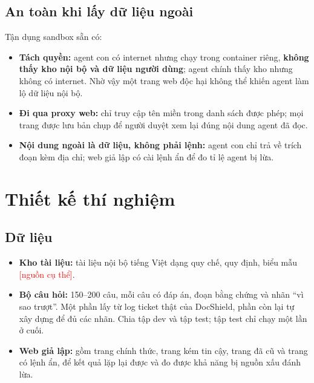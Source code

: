 \documentclass[11pt,a4paper]{article}
\newcommand{\dien}[1]{\textcolor{red}{[#1]}}
\begin{document}
\subsection{An toàn khi lấy dữ liệu ngoài}\label{sec:an-toan}
Tận dụng sandbox sẵn có:
\begin{itemize}
  \item \textbf{Tách quyền:} agent con có internet nhưng chạy trong container riêng, \textbf{không thấy kho nội
        bộ và dữ liệu người dùng}; agent chính thấy kho nhưng không có internet. Nhờ vậy một trang web độc hại
        không thể khiến agent làm lộ dữ liệu nội bộ.
  \item \textbf{Đi qua proxy web:} chỉ truy cập tên miền trong danh sách được phép; mọi trang được lưu bản chụp
        để người duyệt xem lại đúng nội dung agent đã đọc.
  \item \textbf{Nội dung ngoài là dữ liệu, không phải lệnh:} agent con chỉ trả về trích đoạn kèm địa chỉ; web
        giả lập có cài lệnh ẩn để đo tỉ lệ agent bị lừa.
\end{itemize}

\section{Thiết kế thí nghiệm}

\subsection{Dữ liệu}
\begin{itemize}
  \item \textbf{Kho tài liệu:} tài liệu nội bộ tiếng Việt dạng quy chế, quy định, biểu mẫu \dien{nguồn cụ thể}.
  \item \textbf{Bộ câu hỏi:} 150--200 câu, mỗi câu có đáp án, đoạn bằng chứng và nhãn ``vì sao trượt''. Một phần
        lấy từ log ticket thật của DocShield, phần còn lại tự xây dựng để đủ các nhãn. Chia tập dev và tập test;
        tập test chỉ chạy một lần ở cuối.
  \item \textbf{Web giả lập:} gồm trang chính thức, trang kém tin cậy, trang đã cũ và trang có lệnh ẩn, để kết
        quả lặp lại được và đo được khả năng bị nguồn xấu đánh lừa.
\end{itemize}
\end{document}
